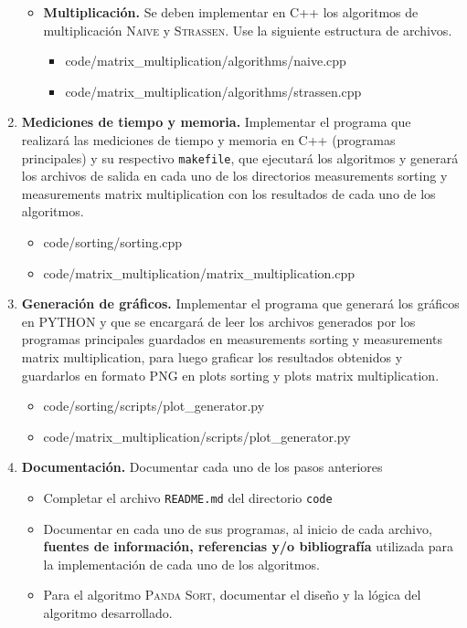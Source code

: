 \begin{enumerate}[(1)]
\begin{itemize}
        \item \textbf{Multiplicación. } Se deben implementar en C++ los algoritmos de multiplicación \textsc{Naive} y \textsc{Strassen}. Use la siguiente estructura de archivos. 
    \begin{itemize}
        \item code/matrix\_multiplication/algorithms/naive.cpp
        \item code/matrix\_multiplication/algorithms/strassen.cpp
    \end{itemize}
    \end{itemize}

    \item \textbf{Mediciones de tiempo y memoria.}  Implementar el programa que realizará las mediciones de tiempo y memoria en C++ (programas principales) y su respectivo \texttt{makefile}, que ejecutará los algoritmos y generará los archivos de salida en cada uno de los directorios measurements sorting y measurements matrix multiplication con los resultados de cada uno de los algoritmos.
    \begin{itemize}
        \item code/sorting/sorting.cpp
        \item code/matrix\_multiplication/matrix\_multiplication.cpp
    \end{itemize}
    
    \item \textbf{Generación de gráficos. } Implementar el programa que generará los gráficos en PYTHON y que se encargará de leer los archivos generados por los programas principales guardados en measurements sorting y measurements matrix multiplication, para luego graficar los resultados obtenidos y guardarlos en formato PNG en plots sorting y plots matrix multiplication.
    \begin{itemize}
        \item code/sorting/scripts/plot\_generator.py
        \item code/matrix\_multiplication/scripts/plot\_generator.py
    \end{itemize}
    \item \textbf{Documentación.} Documentar cada uno de los pasos anteriores
    \begin{itemize}
        \item Completar el archivo \texttt{README.md} del directorio \texttt{code}
        \item Documentar en cada uno de sus programas, al inicio de cada archivo, \textbf{fuentes de información, referencias y/o bibliografía} utilizada para la implementación de cada uno de los algoritmos.
        \item Para el algoritmo \textsc{Panda Sort}, documentar el diseño y la lógica del algoritmo desarrollado.
    \end{itemize}
\end{enumerate}

